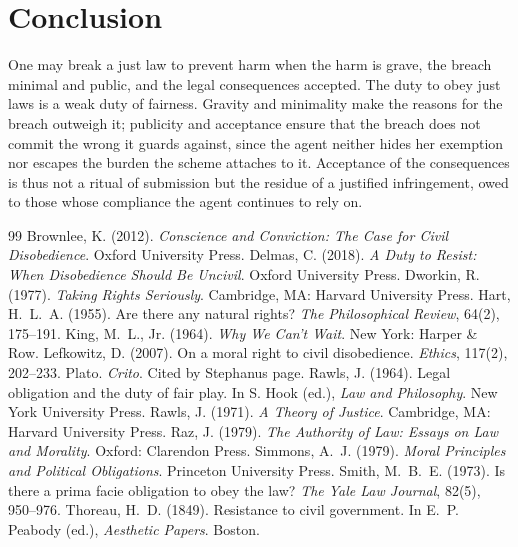\documentclass{situationist-preprint}
\begin{document}
\section{Conclusion}

One may break a just law to prevent harm when the harm is grave, the breach minimal and public, and the legal consequences accepted. The duty to obey just laws is a weak duty of fairness. Gravity and minimality make the reasons for the breach outweigh it; publicity and acceptance ensure that the breach does not commit the wrong it guards against, since the agent neither hides her exemption nor escapes the burden the scheme attaches to it. Acceptance of the consequences is thus not a ritual of submission but the residue of a justified infringement, owed to those whose compliance the agent continues to rely on.

\begin{thebibliography}{99}\small
{} Brownlee, K. (2012). \emph{Conscience and Conviction: The Case for Civil Disobedience}. Oxford University Press.
 Delmas, C. (2018). \emph{A Duty to Resist: When Disobedience Should Be Uncivil}. Oxford University Press.
 Dworkin, R. (1977). \emph{Taking Rights Seriously}. Cambridge, MA: Harvard University Press.
 Hart, H.~L.~A. (1955). Are there any natural rights? \emph{The Philosophical Review}, 64(2), 175--191.
 King, M.~L., Jr. (1964). \emph{Why We Can't Wait}. New York: Harper \& Row.
 Lefkowitz, D. (2007). On a moral right to civil disobedience. \emph{Ethics}, 117(2), 202--233.
 Plato. \emph{Crito}. Cited by Stephanus page.
 Rawls, J. (1964). Legal obligation and the duty of fair play. In S. Hook (ed.), \emph{Law and Philosophy}. New York University Press.
 Rawls, J. (1971). \emph{A Theory of Justice}. Cambridge, MA: Harvard University Press.
 Raz, J. (1979). \emph{The Authority of Law: Essays on Law and Morality}. Oxford: Clarendon Press.
 Simmons, A.~J. (1979). \emph{Moral Principles and Political Obligations}. Princeton University Press.
 Smith, M.~B.~E. (1973). Is there a prima facie obligation to obey the law? \emph{The Yale Law Journal}, 82(5), 950--976.
 Thoreau, H.~D. (1849). Resistance to civil government. In E.~P. Peabody (ed.), \emph{Aesthetic Papers}. Boston.
\end{thebibliography}
\end{document}

